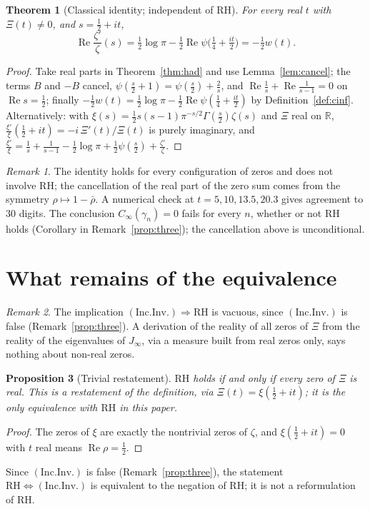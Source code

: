 \documentclass[11pt]{amsart}
\newtheorem{theorem}{Theorem}[section]
\newtheorem{proposition}[theorem]{Proposition}
\theoremstyle{definition}
\theoremstyle{remark}
\newtheorem{remark}[theorem]{Remark}
\newtheorem*{remark*}{Remark}
\newcommand{\RH}{\mathrm{RH}}
\renewcommand{\Re}{\operatorname{Re}}
\newcommand{\half}{\tfrac12}
\newcommand{\Cinf}{C_\infty}
\newcommand{\Jinf}{J_\infty}
\newcommand{\gamn}{\gamma_n}
\newcommand{\incInv}{(\mathrm{Inc.Inv.})}
\newcommand{\psidig}{\psi}
\begin{document}
\begin{theorem}[Classical identity; independent of $\RH$]\label{thm:rh-implies-ii}
For every real $t$ with $\Xi(t)\ne0$, and $s=\half+it$,
\[
\Re\frac{\zeta'}{\zeta}(s)=\tfrac12\log\pi-\tfrac12\Re\psidig\big(\tfrac14+\tfrac{it}2\big)
=-\tfrac12w(t).
\]
\end{theorem}
\begin{proof}
Take real parts in Theorem~\ref{thm:had} and use Lemma~\ref{lem:cancel}; the terms $B$ and
$-B$ cancel, $\psidig(\frac s2+1)=\psidig(\frac s2)+\frac2s$, and
$\Re\frac1s+\Re\frac1{s-1}=0$ on $\Re s=\half$; finally $-\half w(t)=\half\log\pi-\half\Re
\psidig(\frac14+\frac{it}2)$ by Definition~\ref{def:cinf}. Alternatively: with
$\xi(s)=\half s(s-1)\pi^{-s/2}\Gamma(\frac s2)\zeta(s)$ and $\Xi$ real on $\mathbb R$,
$\frac{\xi'}{\xi}(\half+it)=-i\,\Xi'(t)/\Xi(t)$ is purely imaginary, and
$\frac{\xi'}{\xi}=\frac1s+\frac1{s-1}-\half\log\pi+\half\psidig(\frac s2)+\frac{\zeta'}{\zeta}$.
\end{proof}

\begin{remark*}
The identity holds for every configuration of zeros and does not involve $\RH$; the
cancellation of the real part of the zero sum comes from the symmetry $\rho\mapsto1-\bar\rho$.
A numerical check at $t=5,10,13.5,20.3$ gives agreement to $30$ digits. The conclusion $\Cinf(\gamn)=0$ fails for every $n$, whether or not $\RH$ holds (Corollary in Remark~\ref{prop:three}); the cancellation above is unconditional.
\end{remark*}

\section{What remains of the equivalence}\label{sec:equiv}

\begin{remark}\label{thm:D}
The implication $\incInv\Rightarrow\RH$ is vacuous, since $\incInv$ is false
(Remark~\ref{prop:three}). A derivation of the reality of all zeros of $\Xi$ from the reality of
the eigenvalues of $\Jinf$, via a measure built from real zeros only, says nothing about non-real
zeros.
\end{remark}

\begin{proposition}[Trivial restatement]\label{thm:equiv}
$\RH$ holds if and only if every zero of $\Xi$ is real. This is a restatement of the definition,
via $\Xi(t)=\xi(\half+it)$; it is the only equivalence with $\RH$ in this paper.
\end{proposition}
\begin{proof}
The zeros of $\xi$ are exactly the nontrivial zeros of $\zeta$, and $\xi(\half+it)=0$ with $t$
real means $\Re\rho=\half$.
\end{proof}
Since $\incInv$ is false (Remark~\ref{prop:three}), the statement $\RH\iff\incInv$ is equivalent to the negation of $\RH$; it is not a reformulation of $\RH$.
\end{document}
